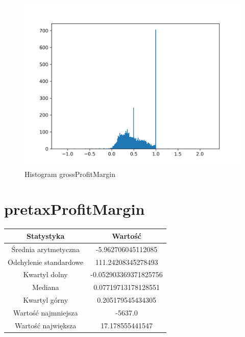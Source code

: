 \documentclass{article}
\begin{document}
\begin{figure}[h!]
    \includegraphics[width=\linewidth]{variables/grossProfitMargin.png}
    \caption{Histogram grossProfitMargin }
\end{figure}\section{ pretaxProfitMargin }

\begin{center}
    \begin{tabular}{|c | c|} 
    \hline
    Statystyka & Wartość \\
    \hline\hline
    Średnia arytmetyczna & -5.962706045112085 \\ 
    \hline
    Odchylenie standardowe & 111.24208345278493 \\
    \hline
    Kwartyl dolny & -0.052903369371825756 \\
    \hline
    Mediana & 0.07719713178128551 \\
    \hline
    Kwartyl górny & 0.205179545434305 \\
    \hline
    Wartość najmniejsza & -5637.0 \\
    \hline
    Wartość największa & 17.178555441547 \\
    \hline
   \end{tabular}
\end{center}
\end{document}
